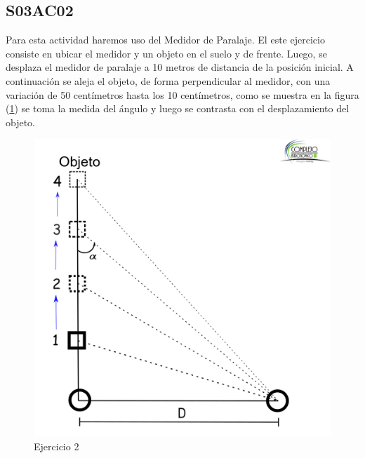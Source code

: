 \documentclass[10pt,a4paper]{article}
\begin{document}
\subsection{S03AC02}
Para esta actividad haremos uso del Medidor de Paralaje. El este ejercicio consiste  en ubicar el medidor y un objeto en el suelo y de frente. Luego, se desplaza el medidor de paralaje a 10 metros de distancia de la posición inicial. A continuación se aleja el objeto, de forma perpendicular al medidor, con una variación de 50 centímetros hasta los 10 centímetros, como se muestra en la figura (\ref{paralaje_3}) se toma la medida del ángulo y luego se contrasta con el desplazamiento del objeto.
\begin{figure}[H]
\centering
\includegraphics[scale=0.18]{Imagenes/Paralaje_03}
\caption{Ejercicio 2}
\label{paralaje_3}
\end{figure}
\end{document}
